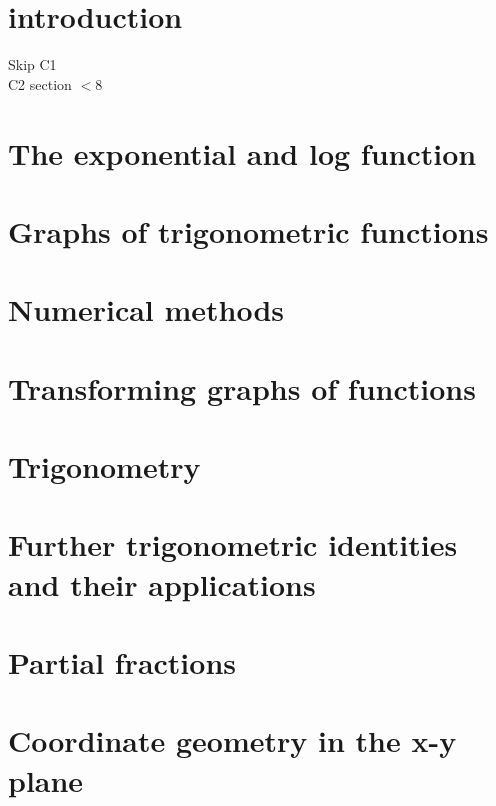 \documentclass[a4paper]{article}
\begin{document}
\maketitle


\tableofcontents

\setcounter{section}{-1}
\section{introduction}
Skip C1\\

C2 section $< 8$




\section{The exponential and log function}

\section{Graphs of trigonometric functions}

\section{Numerical methods}

\section{Transforming graphs of functions}

\section{Trigonometry}

\section{Further trigonometric identities and their applications}

\section{Partial fractions}

\section{Coordinate geometry in the x-y plane}
\end{document}

